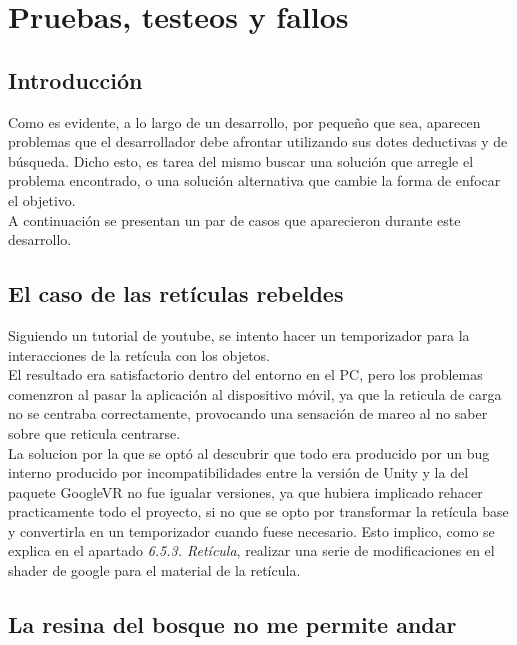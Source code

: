 \section{Pruebas, testeos y fallos}

\subsection{Introducción}

\quad Como es evidente, a lo largo de un desarrollo, por pequeño que sea, aparecen problemas que el desarrollador debe afrontar utilizando sus dotes deductivas y de búsqueda. Dicho esto, es tarea del mismo buscar una solución que arregle el problema encontrado, o una solución alternativa que cambie la forma de enfocar el objetivo.\\

\quad A continuación se presentan un par de casos que aparecieron durante este desarrollo.\\

\subsection{El caso de las retículas rebeldes}

\quad Siguiendo un tutorial de youtube, se intento hacer un temporizador para la interacciones de la retícula con los objetos.\\

\quad El resultado era satisfactorio dentro del entorno en el PC, pero los problemas comenzron al pasar la aplicación al dispositivo móvil, ya que la reticula de carga no se centraba correctamente, provocando una sensación de mareo al no saber sobre que reticula centrarse.\\ 

\quad La solucion por la que se optó al descubrir que todo era producido por un bug interno producido por incompatibilidades entre la versión de Unity y la del paquete GoogleVR no fue igualar versiones, ya que hubiera implicado rehacer practicamente todo el proyecto, si no que se opto por transformar la retícula base y convertirla en un temporizador cuando fuese necesario. Esto implico, como se explica en el apartado \textit{6.5.3. Retícula}, realizar una serie de modificaciones en el shader de google para el material de la retícula.\\

\subsection{La resina del bosque no me permite andar}

